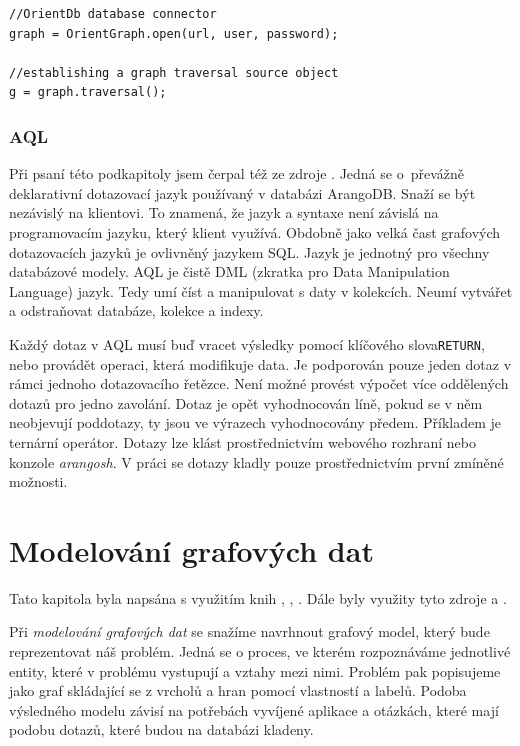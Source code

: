 \documentclass[
  program=infoi,
  biblatex=true,
  figures=true,
  glossaries=false,
  index,
  sourcecodes=true
]{kidiplom}
\begin{document}
\begin{listing}[h]
\begin{verbatim}
//OrientDb database connector
graph = OrientGraph.open(url, user, password);

//establishing a graph traversal source object
g = graph.traversal();
\end{verbatim}
\caption{Připojení se k databázi OrientDB v Gremlin Console.}
\label{kod:establishConnection}
\end{listing}

\subsubsection{AQL}
Při psaní této podkapitoly jsem čerpal též ze zdroje \cite{arangoDBDoc}. Jedná se o~převážně deklarativní dotazovací jazyk používaný v databázi ArangoDB. Snaží se být nezávislý na klientovi. To znamená, že jazyk a syntaxe není závislá na programovacím jazyku, který klient využívá. Obdobně jako velká čast grafových dotazovacích jazyků je ovlivněný jazykem SQL. Jazyk je jednotný pro všechny databázové modely. AQL je čistě DML (zkratka pro Data Manipulation Language) jazyk. Tedy umí číst a manipulovat s daty v kolekcích. Neumí vytvářet a odstraňovat databáze, kolekce a indexy.

Každý dotaz v AQL musí buď vracet výsledky pomocí klíčového slova\linebreak \texttt{RETURN}, nebo provádět operaci, která modifikuje data. Je podporován pouze jeden dotaz v rámci jednoho dotazovacího řetězce. Není možné provést výpočet více oddělených dotazů pro jedno zavolání. Dotaz je opět vyhodnocován líně, pokud se v něm neobjevují poddotazy, ty jsou ve výrazech vyhodnocovány předem. Příkladem je ternární operátor. Dotazy lze klást prostřednictvím webového rozhraní nebo konzole \textit{arangosh}. V práci se dotazy kladly pouze prostřednictvím první zmíněné možnosti.
\clearpage
\section{Modelování grafových dat}
Tato kapitola byla napsána s využitím knih \cite{inAction}, \cite{graphDatabases}, \cite{practitioner}. Dále byly využity tyto zdroje \cite{ionos} a \cite{neo4jDev}.

Při \textit{modelování grafových dat} se snažíme navrhnout grafový model, který bude reprezentovat náš problém. Jedná se o proces, ve kterém rozpoznáváme jednotlivé entity, které v problému vystupují a vztahy mezi nimi. Problém pak popisujeme jako graf skládající se z vrcholů a hran pomocí vlastností a labelů. Podoba výsledného modelu závisí na potřebách vyvíjené aplikace a otázkách, které mají podobu dotazů, které budou na databázi kladeny.
\end{document}
